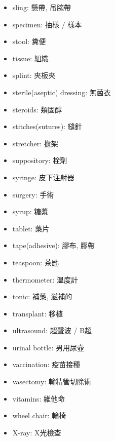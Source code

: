 \begin{multicols}{2}
\begin{itemize}
  \item sling: 懸帶, 吊腕帶
  \item specimen: 抽樣 / 樣本
  \item stool: 糞便
  \item tissue: 組織
  \item splint: 夾板夾
  \item sterile(aseptic) dressing: 無菌衣
  \item steroids: 類固醇
  \item stitches(sutures): 縫針
  \item stretcher: 擔架
  \item suppository: 栓劑
  \item syringe: 皮下注射器
  \item surgery: 手術
  \item syrup: 糖漿
  \item tablet: 藥片
  \item tape(adhesive): 膠布, 膠帶
  \item teaspoon: 茶匙
  \item thermometer: 溫度計
  \item tonic: 補藥, 滋補的
  \item transplant: 移植
  \item ultrasound: 超聲波 / B超
  \item urinal bottle: 男用尿壺
  \item vaccination: 疫苗接種
  \item vasectomy: 輸精管切除術
  \item vitamins: 維他命
  \item wheel chair: 輪椅
  \item X-ray: X光檢查
\end{itemize}
\end{multicols}

